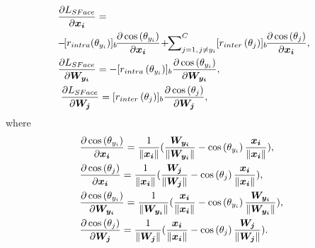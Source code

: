 \documentclass[journal,comsoc]{IEEEtran}
\begin{document}
\begin{equation}
\label{equ:sface_back}
\begin{gathered}
\frac{{\partial {L_{SFace}}}}{{\partial\bm{{x_i}}}} =\hfill \\  
-\![{r_{intra}}\!\left( {{{{\theta }}_{{{{y}}_{{i}}}}}} \right)]_b\!\frac{{\partial \cos \left( {{{{\theta }}_{{{{y}}_{{i}}}}}} \right)}}{{\partial {\bm{x_{{i}}}}}} \! + \!\!\mathop \sum \nolimits_{j = 1,\!\;j \ne {y_i}}^C[{r_{inter}}\left( {{\theta _j}} \right)]_b\!\frac{{\partial \cos \left( {{\theta _j}} \right)}}{{\partial \bm{{x_i}}}},\hfill \\
\frac{{\partial {L_{SFace}}}}{{\partial \bm{{W_{{y_i}}}}}}=-[{r_{intra}}\left( {{{{\theta }}_{{{{y}}_{{i}}}}}} \right)]_b\frac{{\partial \cos \left( {{\theta _{{y_i}}}} \right)}}{\partial{\bm{{W_{{y_i}}}}}},\hfill \\
\frac{{\partial {L_{SFace}}}}{{\partial\bm{{W_{{j}}}}}} = [{r_{inter}}\left( {{\theta _j}} \right)]_b\frac{{\partial \cos \left( {{\theta _j}} \right)}}{\partial\bm{{{W_{{j}}}}}},\qquad\qquad\qquad\qquad\qquad
\end{gathered}
\end{equation}where
\begin{equation}
\label{equation:cos}
\begin{gathered}
\frac{{\partial \cos \left( {{\theta _{{y_i}}}} \right)}}{{\partial \bm{x_i}}} = \frac{1}{{\left\| {\bm{x_i}} \right\|}}(\frac{{\bm{W_{{y_i}}}}}{{\left\| {\bm{W_{{y_i}}}} \right\|}} - \cos \left( {{\theta _{{y_i}}}} \right)\frac{{\bm{x_i}}}{{\left\| {\bm{x_i}} \right\|}}),\hfill \\ 
\frac{{\partial \cos \left( {{\theta _j}} \right)}}{{\partial \bm{x_i}}} = \frac{1}{{\left\| {\bm{x_i}} \right\|}}(\frac{{\bm{W_j}}}{{\left\| {\bm{W_j}} \right\|}} - \cos \left( {{\theta _j}} \right)\frac{{\bm{x_i}}}{{\left\| {\bm{x_i}} \right\|}}),\hfill \\ 
\frac{{\partial \cos \left( {{\theta _{{y_i}}}} \right)}}{{\partial \bm{W_{{y_i}}}}} = \frac{1}{{\left\| {\bm{W_{{y_i}}}} \right\|}}(\frac{{\bm{x_i}}}{{\left\| {\bm{x_i}} \right\|}} - \cos \left( {{\theta _{{y_i}}}} \right)\frac{{\bm{W_{{y_i}}}}}{{\left\| {\bm{W_{{y_i}}}} \right\|}}),\hfill \\ 
\frac{{\partial \cos \left( {{\theta _j}} \right)}}{{\partial \bm{W_j}}} = \frac{1}{{\left\| {\bm{W_j}} \right\|}}(\frac{{\bm{x_i}}}{{\left\| {\bm{x_i}} \right\|}} - \cos \left( {{\theta _j}} \right)\frac{{\bm{W_j}}}{{\left\| {\bm{W_j}} \right\|}}).\qquad
\end{gathered}
\end{equation}
\end{document}
